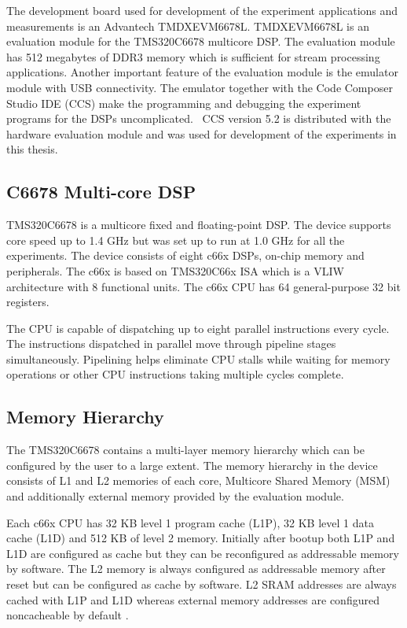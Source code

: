 The development board used for development of the experiment applications and measurements is an Advantech TMDXEVM6678L. TMDXEVM6678L is an evaluation module for the TMS320C6678 multicore DSP. The evaluation module has 512 megabytes of DDR3 memory which is sufficient for stream processing applications. Another important feature of the evaluation module is the emulator module with USB connectivity. The emulator together with the Code Composer Studio IDE (CCS) make the programming and debugging the experiment programs for the DSPs uncomplicated.~\cite{evmref} CCS version 5.2 is distributed with the hardware evaluation module and was used for development of the experiments in this thesis.

\subsection{C6678 Multi-core DSP}
\label{subsec:c66x}
TMS320C6678 is a multicore fixed and floating-point DSP. The device supports core speed up to 1.4 GHz but was set up to run at 1.0 GHz for all the experiments. The device consists of eight c66x DSPs, on-chip memory and peripherals. The c66x is based on TMS320C66x ISA which is a VLIW architecture with 8 functional units. The c66x CPU has 64 general-purpose 32 bit registers. \cite{sprugh7} 

The CPU is capable of dispatching up to eight parallel instructions every cycle. The instructions dispatched in parallel move through pipeline stages simultaneously. Pipelining helps eliminate CPU stalls while waiting for memory operations or other CPU instructions taking multiple cycles complete. \cite{sprugh7} 

\subsection{Memory Hierarchy}
\label{subsec:c66memory}


The TMS320C6678 contains a multi-layer memory hierarchy which can be configured by the user to a large extent. The memory hierarchy in the device consists of L1 and L2 memories of each core, Multicore Shared Memory (MSM) and additionally external memory provided by the evaluation module.

Each c66x CPU has 32 KB level 1 program cache (L1P), 32 KB level 1 data cache (L1D) and 512 KB of level 2 memory. Initially after bootup both L1P and L1D are configured as cache but they can be reconfigured as addressable memory by software. The L2 memory is always configured as addressable memory after reset but can be configured as cache by software. \cite{tmsdatasheet} L2 SRAM addresses are always cached with L1P and L1D whereas external memory addresses are configured noncacheable by default \cite{cacheguide}.

